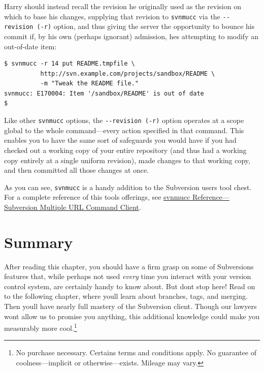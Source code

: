 Harry should instead recall the revision he originally used as the
revision on which to base his changes, supplying that revision to
\texttt{svnmucc} via the \texttt{-\/-revision\ (-r)} option, and thus
giving the server the opportunity to bounce his commit if, by his own
(perhaps ignorant) admission, he\textquotesingle s attempting to modify
an out-of-date item:

\begin{verbatim}
$ svnmucc -r 14 put README.tmpfile \
          http://svn.example.com/projects/sandbox/README \
          -m "Tweak the README file."
svnmucc: E170004: Item '/sandbox/README' is out of date
$
\end{verbatim}

Like other \texttt{svnmucc} options, the \texttt{-\/-revision\ (-r)}
option operates at a scope global to the whole command---every action
specified in that command. This enables you to have the same sort of
safeguards you would have if you had checked out a working copy of your
entire repository (and thus had a working copy entirely at a single
uniform revision), made changes to that working copy, and then committed
all those changes at once.

As you can see, \texttt{svnmucc} is a handy addition to the Subversion
user\textquotesingle s tool chest. For a complete reference of this
tool\textquotesingle s offerings, see \hyperref[svn.ref.svnmucc]{svnmucc
Reference---Subversion Multiple URL Command Client}.

\section{Summary}\label{svn.advanced.summary}

After reading this chapter, you should have a firm grasp on some of
Subversion\textquotesingle s features that, while perhaps not used
\emph{every} time you interact with your version control system, are
certainly handy to know about. But don\textquotesingle t stop here! Read
on to the following chapter, where you\textquotesingle ll learn about
branches, tags, and merging. Then you\textquotesingle ll have nearly
full mastery of the Subversion client. Though our lawyers
won\textquotesingle t allow us to promise you anything, this additional
knowledge could make you measurably more cool.\footnote{No purchase
  necessary. Certains terms and conditions apply. No guarantee of
  coolness---implicit or otherwise---exists. Mileage may vary.}

